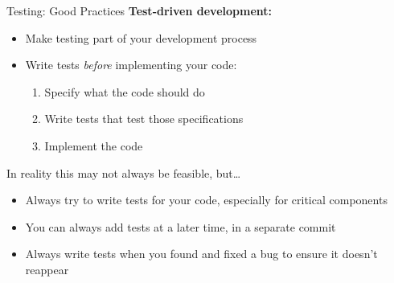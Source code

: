 \begin{frame}{Testing: Good Practices}
  \textcolor{ccyan}{\textbf{Test-driven development:}}
  \begin{itemize}
      \item [\to] Make testing part of your development process
      \item [\to] Write tests \emph{before} implementing your code:
      \begin{enumerate}
        \item Specify what the code should do
        \item Write tests that test those specifications
        \item Implement the code
      \end{enumerate}
  \end{itemize}
  \vspace{1em}
  In reality this may not always be feasible, but\dots
  \begin{itemize}
    \item Always try to write tests for your code, especially for critical components
    \item You can always add tests at a later time, in a separate commit
    \item Always write tests when you found and fixed a bug to ensure it doesn't reappear
  \end{itemize}
\end{frame}

